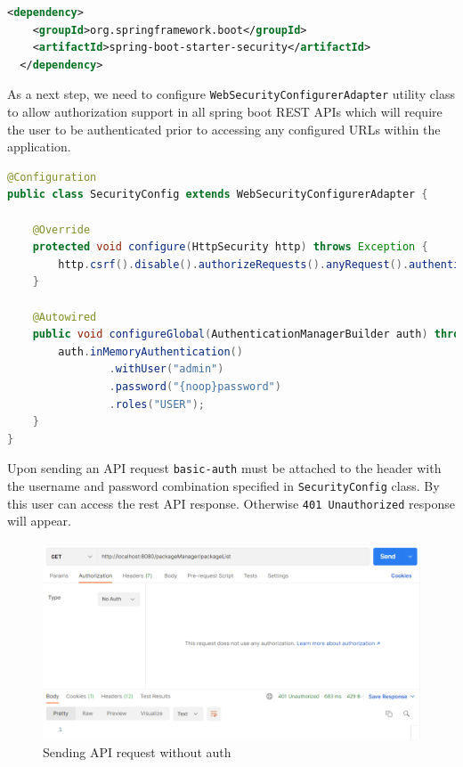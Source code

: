 \begin{lstlisting}[language={XML}]
  <dependency>
    <groupId>org.springframework.boot</groupId>
    <artifactId>spring-boot-starter-security</artifactId>
  </dependency>
\end{lstlisting}

As a next step, we need to configure \texttt{WebSecurityConfigurerAdapter} utility class to allow authorization support in all spring boot REST APIs which will require the user to be authenticated prior to accessing any configured URLs within the application.

\begin{lstlisting}[language={Java}]
@Configuration
public class SecurityConfig extends WebSecurityConfigurerAdapter {

    @Override
    protected void configure(HttpSecurity http) throws Exception {
        http.csrf().disable().authorizeRequests().anyRequest().authenticated().and().httpBasic();
    }

    @Autowired
    public void configureGlobal(AuthenticationManagerBuilder auth) throws Exception {
        auth.inMemoryAuthentication()
                .withUser("admin")
                .password("{noop}password")
                .roles("USER");
    }
}
\end{lstlisting}

Upon sending an API request \texttt{basic-auth} must be attached to the header with the username and password combination specified in \texttt{SecurityConfig} class. By this user can access the rest API response. Otherwise \texttt{401 Unauthorized} response will appear.

\begin{figure}[H]
	\centering
	\includegraphics[width=\textwidth]{images/security-postman-1.png}
	\caption{Sending API request without auth}
	\label{ssec:send-api-without-auth}
\end{figure}

